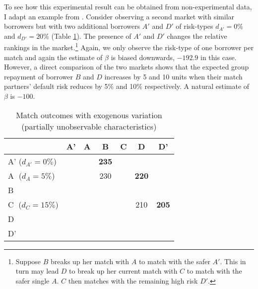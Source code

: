 To see how this experimental result can be obtained from non-experimental data, I adapt an example from \citet{Sorensen2007}. Consider observing a second market with similar borrowers but with two additional borrowers $A'$ and $D'$ of risk-types $d_{A'}=0\%$ and $d_{D'}=20\%$ (Table \ref{Tab:ExogenousVariation}). 
The presence of $A'$ and $D'$ changes the relative rankings in the market.\footnote{Suppose $B$ breaks up her match with $A$ to match with the safer $A'$. This in turn may lead $D$ to break up her current match with $C$ to match with the safer single $A$. $C$ then matches with the remaining high risk $D'$.} Again, we only observe the risk-type of one borrower per match and again the estimate of $\beta$ is biased downwards, $-192.9$ in this case. However, a direct comparison of the two markets shows that the expected group repayment of borrower $B$ and $D$ increases by 5 and 10 units when their match partners' default risk reduces by 5\% and 10\% respectively. A natural estimate of $\beta$ is $-100$.


\begin{table}[htbp!]
\small
   \begin{center}
     \begin{minipage}[c]{0.35\linewidth}
       \caption{Match outcomes with exogenous variation (partially unobservable characteristics)} 
             \label{Tab:ExogenousVariation}
     \end{minipage} \hfill
     \begin{minipage}[c]{0.6\linewidth}
 \centering
 \begin{tabular}{l||cccccc}
 	& \multicolumn{1}{|c|}{A'} & \multicolumn{1}{|c|}{A} & \multicolumn{1}{|c|}{B} & \multicolumn{1}{|c|}{C} & \multicolumn{1}{|c|}{D} & \multicolumn{1}{|c|}{D'} \\
 \hline \hline
 A' ($d_{A'}=0\%$)& &\multicolumn{1}{|c|}{}& \multicolumn{1}{|c|}{\textbf{235}} & \multicolumn{1}{|c|}{} & \multicolumn{1}{|c|}{} & \multicolumn{1}{|c|}{}\\
 \cline{3-7} \cline{1-1}
 A\textcolor{white}{'} ($d_A=5\%$) &&& \multicolumn{1}{|c|}{230} & \multicolumn{1}{|c|}{} & \multicolumn{1}{|c|}{\textbf{220}} & \multicolumn{1}{|c|}{}\\
 \cline{4-7} \cline{1-1}
 B && && \multicolumn{1}{|c|}{} & \multicolumn{1}{|c|}{} & \multicolumn{1}{|c|}{}\\
 \cline{5-7} \cline{1-1}
 C\textcolor{white}{'} ($d_C=15\%$) && & && \multicolumn{1}{|c|}{210} & \multicolumn{1}{|c|}{\textbf{205}}\\
 \cline{6-7} \cline{1-1}
 D  && & && &\multicolumn{1}{|c|}{}\\
 \cline{7-7} \cline{1-1}
 D'  && & && & \\
 \cline{1-1}
 \end{tabular}
     \end{minipage}
   \end{center}
\end{table}


